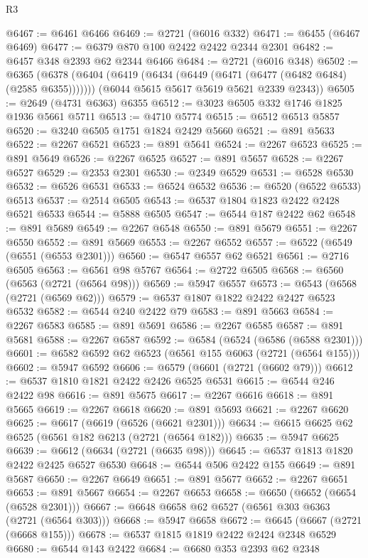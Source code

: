 \begin{lexlean}{R3}
\begin{coremodule}
@6467 := @6461 @6466
@6469 := @2721 (@6016 @332)
@6471 := @6455 (@6467 @6469)
@6477 := @6379 @870 @100 @2422 @2422 @2344 @2301
@6482 := @6457 @348 @2393 @62 @2344 @6466
@6484 := @2721 (@6016 @348)
@6502 := @6365
    (@6378
      (@6404 (@6419 (@6434 (@6449 (@6471 (@6477 (@6482 @6484) (@2585 @6355)))))))
      (@6044 @5615 @5617 @5619 @5621 @2339 @2343))
@6505 := @2649 (@4731 @6363) @6355
@6512 := @3023 @6505 @332 @1746 @1825 @1936 @5661 @5711
@6513 := @4710 @5774
@6515 := @6512 @6513 @5857
@6520 := @3240 @6505 @1751 @1824 @2429 @5660
@6521 := @891 @5633
@6522 := @2267 @6521
@6523 := @891 @5641
@6524 := @2267 @6523
@6525 := @891 @5649
@6526 := @2267 @6525
@6527 := @891 @5657
@6528 := @2267 @6527
@6529 := @2353 @2301
@6530 := @2349 @6529
@6531 := @6528 @6530
@6532 := @6526 @6531
@6533 := @6524 @6532
@6536 := @6520 (@6522 @6533) @6513
@6537 := @2514 @6505
@6543 := @6537 @1804 @1823 @2422 @2428 @6521 @6533
@6544 := @5888 @6505
@6547 := @6544 @187 @2422 @62
@6548 := @891 @5689
@6549 := @2267 @6548
@6550 := @891 @5679
@6551 := @2267 @6550
@6552 := @891 @5669
@6553 := @2267 @6552
@6557 := @6522 (@6549 (@6551 (@6553 @2301)))
@6560 := @6547 @6557 @62 @6521
@6561 := @2716 @6505
@6563 := @6561 @98 @5767
@6564 := @2722 @6505
@6568 := @6560 (@6563 (@2721 (@6564 @98)))
@6569 := @5947 @6557
@6573 := @6543 (@6568 (@2721 (@6569 @62)))
@6579 := @6537 @1807 @1822 @2422 @2427 @6523 @6532
@6582 := @6544 @240 @2422 @79
@6583 := @891 @5663
@6584 := @2267 @6583
@6585 := @891 @5691
@6586 := @2267 @6585
@6587 := @891 @5681
@6588 := @2267 @6587
@6592 := @6584 (@6524 (@6586 (@6588 @2301)))
@6601 := @6582 @6592 @62 @6523 (@6561 @155 @6063 (@2721 (@6564 @155)))
@6602 := @5947 @6592
@6606 := @6579 (@6601 (@2721 (@6602 @79)))
@6612 := @6537 @1810 @1821 @2422 @2426 @6525 @6531
@6615 := @6544 @246 @2422 @98
@6616 := @891 @5675
@6617 := @2267 @6616
@6618 := @891 @5665
@6619 := @2267 @6618
@6620 := @891 @5693
@6621 := @2267 @6620
@6625 := @6617 (@6619 (@6526 (@6621 @2301)))
@6634 := @6615 @6625 @62 @6525 (@6561 @182 @6213 (@2721 (@6564 @182)))
@6635 := @5947 @6625
@6639 := @6612 (@6634 (@2721 (@6635 @98)))
@6645 := @6537 @1813 @1820 @2422 @2425 @6527 @6530
@6648 := @6544 @506 @2422 @155
@6649 := @891 @5687
@6650 := @2267 @6649
@6651 := @891 @5677
@6652 := @2267 @6651
@6653 := @891 @5667
@6654 := @2267 @6653
@6658 := @6650 (@6652 (@6654 (@6528 @2301)))
@6667 := @6648 @6658 @62 @6527 (@6561 @303 @6363 (@2721 (@6564 @303)))
@6668 := @5947 @6658
@6672 := @6645 (@6667 (@2721 (@6668 @155)))
@6678 := @6537 @1815 @1819 @2422 @2424 @2348 @6529
@6680 := @6544 @143 @2422
@6684 := @6680 @353 @2393 @62 @2348

\end{coremodule}
\end{lexlean}
